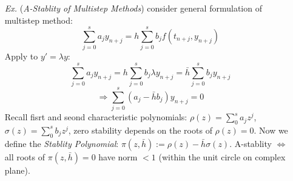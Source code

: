\documentclass[a4paper, 11pt]{article}
\begin{document}
\begin{itemize}
	\item[\textit{Ex.}] (\emph{A-Stablity of Multistep Methods}) consider general formulation of multistep method:
	\begin{equation}
		\sum_{j=0}^s a_j y_{n+j} = h\sum_{j=0}^s b_j f(t_{n+j}, y_{n+j})
	\end{equation}
	Apply to $y'=\lambda y$: 
	\begin{equation}
		\sum_{j=0}^s a_j y_{n+j} = h \sum_{j=0}^s b_j \lambda y_{n+j} = \bar{h} \sum_{j=0}^s b_j y_{n+j}
	\end{equation}
	$$
	\Rightarrow \sum_{j=0}^s (a_j - \bar{h}b_j) y_{n+j} = 0
	$$
	Recall fisrt and seond characteristic polynomials: $\rho(z)=\sum_0^s a_j z^j$, $\sigma(z)=\sum_0^s b_j z^j$, zero stability depends on the roots of $\rho(z)=0$. Now we define the \emph{Stablity Polynomial}: $\pi(z, \bar{h}):=\rho(z) - \bar{h}\sigma(z)$. A-stablity $\iff$ all roots of $\pi(z, \bar{h})=0$ have norm $<1$ (within the unit circle on complex plane).
\end{itemize}
\end{document}
